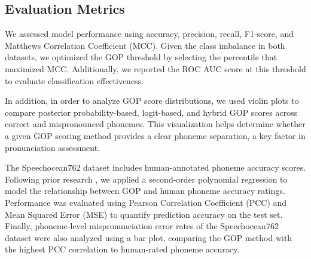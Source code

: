 \documentclass{Interspeech}
\begin{document}
\subsection{Evaluation Metrics}
\label{metricsinfo}



We assessed model performance using accuracy, precision, recall, F1-score, and Matthews Correlation Coefficient (MCC). Given the class imbalance in both datasets, we optimized the GOP threshold by selecting the percentile that maximized MCC. Additionally, we reported the ROC AUC score at this threshold to evaluate classification effectiveness.

In addition, in order to analyze GOP score distributions, we used violin plots to compare posterior probability-based, logit-based, and hybrid GOP scores across correct and mispronounced phonemes. This visualization helps determine whether a given GOP scoring method provides a clear phoneme separation, a key factor in pronunciation assessment.

The Speechocean762 dataset includes human-annotated phoneme accuracy scores. Following prior research \cite{zhang2021speechocean762}, we applied a second-order polynomial regression to model the relationship between GOP and human phoneme accuracy ratings. Performance was evaluated using Pearson Correlation Coefficient (PCC) and Mean Squared Error (MSE) to quantify prediction accuracy on the test set. Finally, phoneme-level mispronunciation error rates of the Speechocean762 dataset were also analyzed using a bar plot, comparing the GOP method with the highest PCC correlation to human-rated phoneme accuracy.
\end{document}
